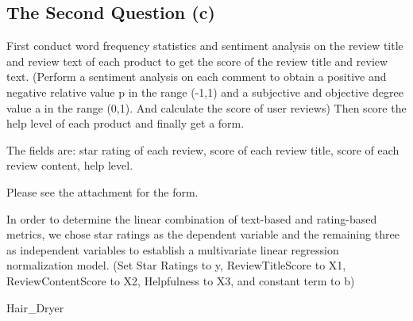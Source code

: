 \documentclass[12pt]{article}
\begin{document}
\subsection{The Second Question (c)}
First conduct word frequency statistics and sentiment analysis on the review title and review text of each product to get the score of the review title and review text. (Perform a sentiment analysis on each comment to obtain a positive and negative relative value p in the range (-1,1) and a subjective and objective degree value a in the range (0,1). And calculate the score of user reviews) Then score the help level of each product and finally get a form.
\par
The fields are: star rating of each review, score of each review title, score of each review content, help level.
\par
Please see the attachment for the form.
\par
In order to determine the linear combination of text-based and rating-based metrics, we chose star ratings as the dependent variable and the remaining three as independent variables to establish a multivariate linear regression normalization model. (Set Star Ratings to y, ReviewTitleScore to X1, ReviewContentScore to X2, Helpfulness to X3, and constant term to b)
\par
\par Hair\_Dryer
\par\quad\par\quad\par\quad\par\quad\par\quad\par\quad\par\quad\par\quad\par\quad\par\quad\par
\quad\par\quad\par\quad\par\quad\par
\end{document}
